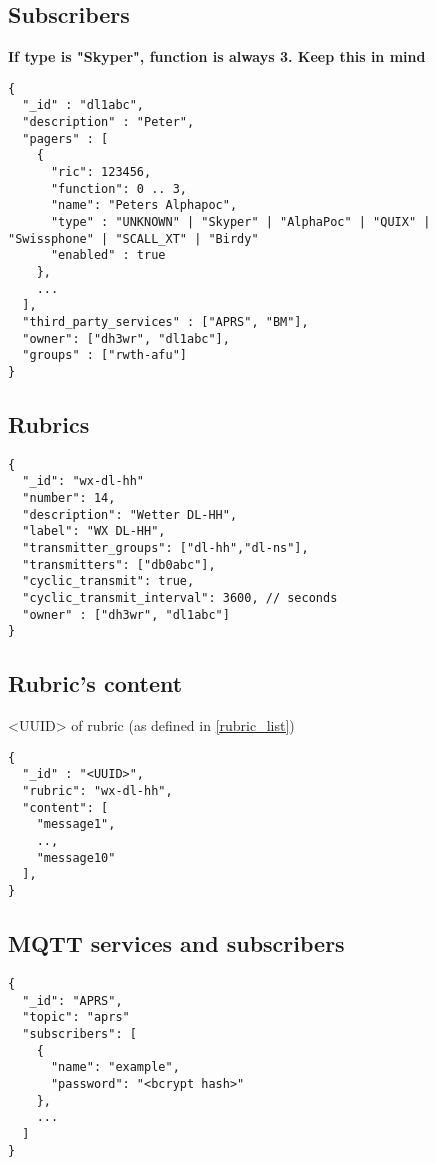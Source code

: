 \subsection{Subscribers}
\label{protocoldef:couchdb:subscribers}
\textbf{If type is "Skyper", function is always 3. Keep this in mind }
\begin{lstlisting}
{
  "_id" : "dl1abc",
  "description" : "Peter",
  "pagers" : [
    {
      "ric": 123456,
      "function": 0 .. 3,
      "name": "Peters Alphapoc",
      "type" : "UNKNOWN" | "Skyper" | "AlphaPoc" | "QUIX" | "Swissphone" | "SCALL_XT" | "Birdy"
      "enabled" : true
    },
    ...
  ],
  "third_party_services" : ["APRS", "BM"],
  "owner": ["dh3wr", "dl1abc"],
  "groups" : ["rwth-afu"]
}
\end{lstlisting}


\subsection{Rubrics}
\label{rubrics}

\begin{lstlisting}
{
  "_id": "wx-dl-hh"
  "number": 14,
  "description": "Wetter DL-HH",
  "label": "WX DL-HH",
  "transmitter_groups": ["dl-hh","dl-ns"],
  "transmitters": ["db0abc"],
  "cyclic_transmit": true,
  "cyclic_transmit_interval": 3600, // seconds
  "owner" : ["dh3wr", "dl1abc"]
}
\end{lstlisting}

\subsection{Rubric's content}
<UUID> of rubric (as defined in \ref{rubric_list})

\begin{lstlisting}
{
  "_id" : "<UUID>",
  "rubric": "wx-dl-hh",
  "content": [
    "message1",
    ..,
    "message10"
  ],
}
\end{lstlisting}

\subsection{MQTT services and subscribers}
\label{protocoldef:couchdb:mqttservicesandsubscribers}
\begin{lstlisting}
{
  "_id": "APRS",
  "topic": "aprs"
  "subscribers": [
    {
      "name": "example",
      "password": "<bcrypt hash>"
    },
    ...
  ]
}
\end{lstlisting}
